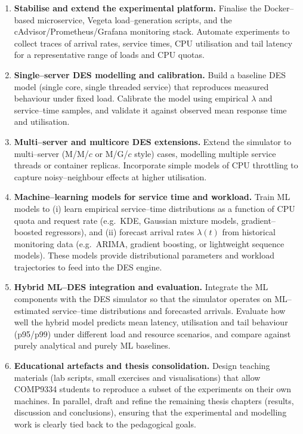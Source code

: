 \begin{enumerate}
  \item \textbf{Stabilise and extend the experimental platform.}
  Finalise the Docker--based microservice, Vegeta load--generation scripts,
  and the cAdvisor/Prometheus/Grafana monitoring stack.  Automate
  experiments to collect traces of arrival rates, service times, CPU
  utilisation and tail latency for a representative range of loads and CPU
  quotas.

  \item \textbf{Single--server DES modelling and calibration.}
  Build a baseline DES model (single core, single threaded service) that
  reproduces measured behaviour under fixed load.  Calibrate the model
  using empirical $\lambda$ and service--time samples, and validate it
  against observed mean response time and utilisation.

  \item \textbf{Multi--server and multicore DES extensions.}
  Extend the simulator to multi--server (M/M/$c$ or M/G/$c$ style) cases,
  modelling multiple service threads or container replicas.  Incorporate
  simple models of CPU throttling to capture noisy--neighbour effects at
  higher utilisation.

  \item \textbf{Machine--learning models for service time and workload.}
  Train ML models to (i) learn empirical service--time distributions as a
  function of CPU quota and request rate (e.g.\ KDE, Gaussian mixture
  models, gradient--boosted regressors), and (ii) forecast arrival rates
  $\lambda(t)$ from historical monitoring data (e.g.\ ARIMA, gradient
  boosting, or lightweight sequence models).  These models provide
  distributional parameters and workload trajectories to feed into the DES
  engine.

  \item \textbf{Hybrid ML--DES integration and evaluation.}
  Integrate the ML components with the DES simulator so that the simulator
  operates on ML--estimated service--time distributions and forecasted
  arrivals.  Evaluate how well the hybrid model predicts mean latency,
  utilisation and tail behaviour (p95/p99) under different load and resource
  scenarios, and compare against purely analytical and purely ML baselines.

  \item \textbf{Educational artefacts and thesis consolidation.}
  Design teaching materials (lab scripts, small exercises and
  visualisations) that allow COMP9334 students to reproduce a subset of the
  experiments on their own machines.  In parallel, draft and refine the
  remaining thesis chapters (results, discussion and conclusions), ensuring
  that the experimental and modelling work is clearly tied back to the
  pedagogical goals.
\end{enumerate}

